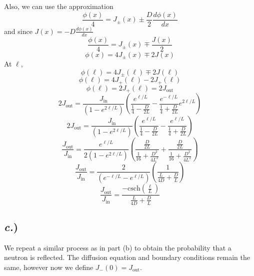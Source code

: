 \documentclass{article}
\begin{document}
Also, we can use the approximation
$$ \frac{\phi(x)}{4} = J_{\pm}(x) \pm \frac{D}{2}\frac{d\phi(x)}{dx} $$
and since $J(x) = -D\frac{d\phi(x)}{dx}$
$$ \frac{\phi(x)}{4} = J_{\pm}(x) \mp \frac{J(x)}{2} $$
$$ \phi(x) = 4J_{\pm}(x) \mp 2J(x) $$
At $\ell$,
$$ \phi(\ell) = 4J_{\pm}(\ell) \mp 2J(\ell) $$
$$ \phi(\ell) = 4J_+(\ell) - 2J_+(\ell) $$
$$ \phi(\ell) = 2J_+(\ell) = 2J_{\text{out}} $$
$$ 2J_{\text{out}} = \frac{J_{\text{in}}}{\left(1 -e^{2\ell/L}\right)}\left(\frac{e^{\ell/L}}{\frac{1}{4} - \frac{D}{2L}} -\frac{e^{-\ell/L}}{\frac{1}{4} + \frac{D}{2L}}e^{2\ell/L}\right)$$
$$ 2J_{\text{out}} = \frac{J_{\text{in}}}{\left(1 -e^{2\ell/L}\right)}\left(\frac{e^{\ell/L}}{\frac{1}{4} - \frac{D}{2L}} -\frac{e^{\ell/L}}{\frac{1}{4} + \frac{D}{2L}}\right)$$
$$ \frac{J_{\text{out}}}{J_{\text{in}}} = \frac{e^{\ell/L}}{2\left(1 -e^{2\ell/L}\right)}\left(\frac{\frac{D}{2L}}{\frac{1}{16} + \frac{D^2}{4L^2}} + \frac{\frac{D}{2L}}{\frac{1}{16} + \frac{D^2}{4L^2}}\right)$$
$$ \frac{J_{\text{out}}}{J_{\text{in}}} = \frac{2}{\left(e^{-\ell/L} -e^{\ell/L}\right)}\left(\frac{1}{\frac{L}{4D} + \frac{D}{L}}\right)$$
$$ \frac{J_{\text{out}}}{J_{\text{in}}} = \frac{-\text{csch}\left(\frac{\ell}{L}\right)}{\frac{L}{4D} + \frac{D}{L}}$$

\subsection*{\textit{c.})}
We repeat a similar process as in part (b) to obtain the probability that a neutron is reflected. The diffusion equation and boundary conditions remain the same, however now we define $J_-(0) = J_{\text{out}}$.
\end{document}
